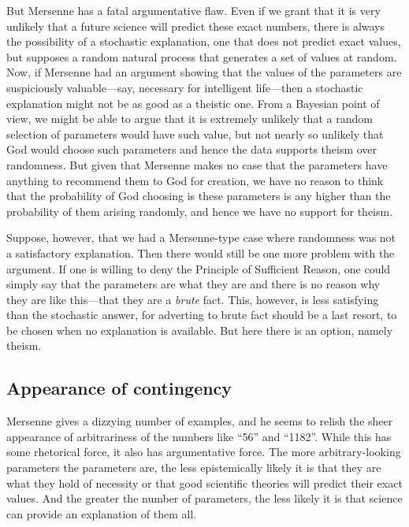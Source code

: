 But Mersenne has a fatal argumentative flaw. Even if we grant that it is very unlikely that a future science will predict
these exact numbers, there is always the possibility of a stochastic explanation, one that does not predict exact values, 
but supposes a random natural process that generates a set of values at random. Now, if Mersenne had an argument showing
that the values of the parameters are suspiciously valuable---say, necessary for intelligent life---then a stochastic
explanation might not be as good as a theistic one. From a Bayesian point of view, we might be able to argue that it is
extremely unlikely that a random selection of parameters would have such value, but not nearly so unlikely that God would
choose such parameters and hence the data supports theism over randomness. But given that Mersenne makes no case that 
the parameters have anything to recommend them to God for creation, we have no reason to think that the probability of God 
choosing is these parameters is any higher than the probability of them arising randomly, and hence we have no support for
theism.

Suppose, however, that we had a Mersenne-type case where randomness was not a satisfactory explanation. Then there would
still be one more problem with the argument. If one is willing to deny the Principle of Sufficient Reason, one could simply
say that the parameters are what they are and there is no reason why they are like this---that they are a \textit{brute} fact.
This, however, is less satisfying than the stochastic answer, for adverting to brute fact should be a last resort, to be
chosen when no explanation is available. But here there is an option, namely theism.

\subsection{Appearance of contingency}
Mersenne gives a dizzying number of examples, and he seems to relish the sheer appearance of arbitrariness of the numbers like ``56''
and ``1182''. While this has some rhetorical force, it also has argumentative force. The more arbitrary-looking parameters
the parameters are, the less epistemically likely it is that they are what they hold of necessity or that good scientific theories
will predict their exact values. And the greater the number of parameters, the less likely it is that science can provide 
an explanation of them all.

